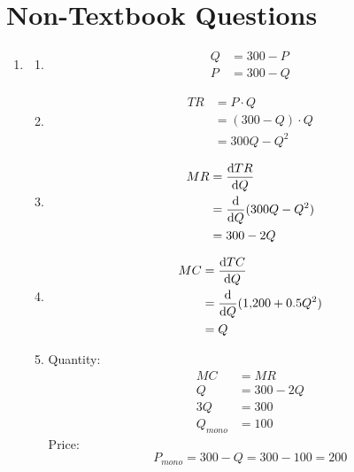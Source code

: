 \documentclass{article}
\begin{document}
\section*{Non-Textbook Questions}

\begin{enumerate}

\item \begin{enumerate}

	\item \begin{align*}
		Q &= 300 - P \\
		P &= 300 - Q
		\end{align*}
		
	\item \begin{align*}
		TR &= P \cdot Q \\
		&= (300 - Q) \cdot Q \\
		&= 300Q - Q^2
		\end{align*}
		
	\item \begin{align*}
		MR &= \odv{TR}{Q} \\
		&= \odv{}{Q}(300Q - Q^2) \\
		&= 300 - 2Q
		\end{align*}
		
	\item \begin{align*}
		MC &= \odv{TC}{Q} \\
		&= \odv{}{Q}(1{,}200 + 0.5Q^2) \\
		&= Q
		\end{align*}
		
	\item Quantity:
		\begin{align*}
		MC &= MR \\
		Q &= 300 - 2Q \\
		3Q &= 300 \\
		Q_{mono} &= 100
		\end{align*}
		Price:
		\begin{equation*}
		P_{mono} = 300 - Q = 300 - 100 = 200
		\end{equation*}

	\end{enumerate}
	
\end{enumerate}
\end{document}
